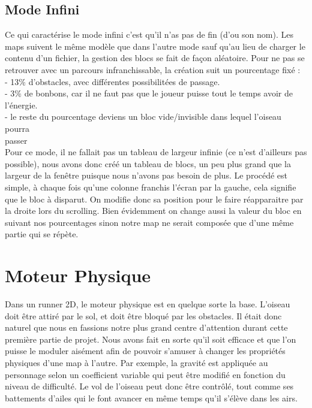 \documentclass [11pt]{report}
\begin{document}
		\vspace{10mm}
		
	
		\subsection{Mode Infini}
		Ce qui caractérise le mode infini c'est qu'il n'as pas de fin (d'ou son nom). Les maps suivent le même modèle que dans l'autre mode sauf qu'au lieu de charger le contenu d'un fichier, la gestion des blocs se fait de façon aléatoire. Pour ne pas se retrouver avec un parcours infranchissable, la création suit un pourcentage fixé :\\
		
		\indent \indent - 13\% d'obstacles, avec différentes possibilitées de passage.\\
		\indent \indent - 3\% de bonbons, car il ne faut pas que le joueur puisse tout le temps avoir de \indent \indent l'énergie.\\
		\indent \indent - le reste du pourcentage deviens un bloc vide/invisible dans lequel l'oiseau pourra\\
		\indent \indent passer\\
		
			
		Pour ce mode, il ne fallait pas un tableau de largeur infinie (ce n'est d'ailleurs pas possible), nous avons donc créé un tableau de blocs, un peu plus grand que la largeur de la fenêtre puisque nous n'avons pas besoin de plus. Le procédé est simple, à chaque fois qu'une colonne franchis l'écran par la gauche, cela signifie que le bloc à disparut. On modifie donc sa position pour le faire réapparaitre par la droite lors du scrolling. Bien évidemment on change aussi la valeur du bloc en suivant nos pourcentages sinon notre map ne serait composée que d'une même partie qui se répète.


	\vspace{15mm}


	\section{Moteur Physique}
		Dans un runner 2D, le moteur physique est en quelque sorte la base. L'oiseau doit être attiré par le sol, et doit être bloqué par les obstacles. Il était donc naturel que nous en fassions notre plus grand centre d'attention durant cette première partie de projet. Nous avons fait en sorte qu'il soit efficace et que l'on puisse le moduler aisément afin de pouvoir s'amuser à changer les propriétés physiques d'une map à l'autre. Par exemple, la gravité est appliquée au personnage selon un coefficient variable qui peut être modifié en fonction du niveau de difficulté. Le vol  de l'oiseau peut donc être contrôlé, tout comme ses battements d'ailes qui le font avancer en même temps qu'il s'élève dans les airs. \\\\
		
\end{document}
